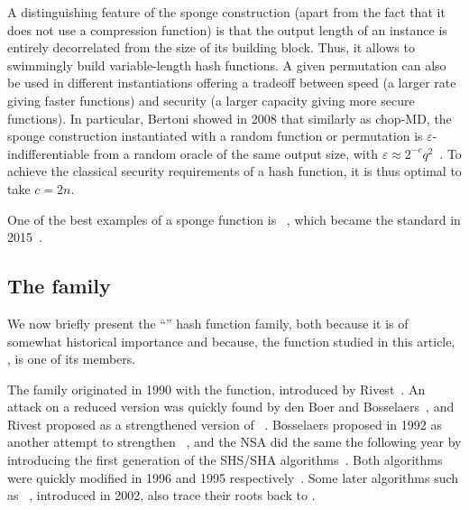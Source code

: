 A distinguishing feature of the sponge construction (apart from the fact that it does not use a compression function) is that the output length of an instance is entirely decorrelated from the size of its building
block. Thus, it allows to swimmingly build variable-length hash functions. A given permutation can also be used in different instantiations offering a tradeoff between speed (a larger rate giving
faster functions) and security (a larger capacity giving more secure functions).
In particular, Bertoni \etal showed in 2008 that similarly as chop-MD, the sponge construction instantiated with a random function or permutation is $\varepsilon$-indifferentiable from a random oracle
of the same output size, with $\varepsilon \approx 2^{-c}q^2$~\cite{DBLP:conf/eurocrypt/BertoniDPA08}. To achieve the classical security requirements of a hash function, it is thus optimal to take $c = 2n$.

One of the best examples of a sponge function is \keccak~\cite{KeccakReference}, which became the \shathree standard in 2015~\cite{Nist-SHA3}. 

\subsection{The \mdsha family}
\label{sec:mdsha}
We now briefly present the ``\mdsha'' hash function family, both because it is of somewhat historical importance and because, the function studied in this article, \shaone, is one of its members.

The family originated in 1990 with the \mdfour function, introduced by Rivest~\cite{Rivest-md4}. An attack on a reduced version was quickly found by den Boer and Bosselaers~\cite{DBLP:conf/crypto/BoerB91},
and Rivest proposed \mdfive as a strengthened version of \mdfour~\cite{Rivest-md5}. Bosselaers proposed \ripemd in 1992 as another attempt to strengthen \mdfour~\cite[Chap. 3]{DBLP:books/sp/BosselaersP95},
and the NSA did the same the following year by introducing the first generation of the SHS/SHA algorithms~\cite{Nist-SHA0}. Both algorithms were quickly modified in 1996 and 1995 respectively~\cite{DBLP:conf/fse/DobbertinBP96,Nist-SHA1}.
Some later algorithms such as \shatwo~\cite{Nist-SHA}, introduced in 2002, also trace their roots back to \mdfour.

